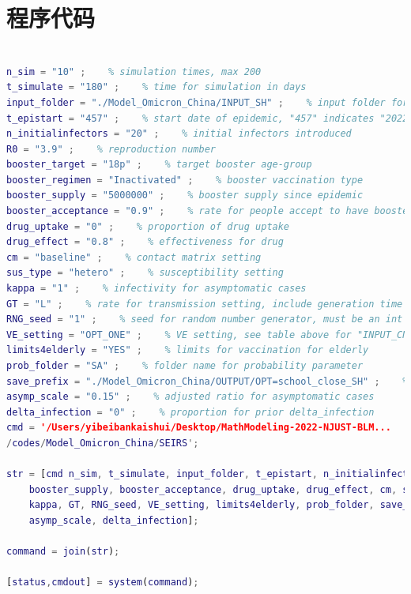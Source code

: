 \documentclass[bwprint]{gmcmthesis}
\numberwithin{figure}{section}
\begin{document}



\newpage
\appendix
\section{程序代码}
\begin{lstlisting}[language=Matlab] 
% 主函数

n_sim = "10" ;    % simulation times, max 200
t_simulate = "180" ;    % time for simulation in days
input_folder = "./Model_Omicron_China/INPUT_SH" ;    % input folder for parameters
t_epistart = "457" ;    % start date of epidemic, "457" indicates "2022-03-01"
n_initialinfectors = "20" ;    % initial infectors introduced
R0 = "3.9" ;    % reproduction number
booster_target = "18p" ;    % target booster age-group
booster_regimen = "Inactivated" ;    % booster vaccination type
booster_supply = "5000000" ;    % booster supply since epidemic
booster_acceptance = "0.9" ;    % rate for people accept to have booster shot
drug_uptake = "0" ;    % proportion of drug uptake
drug_effect = "0.8" ;    % effectiveness for drug
cm = "baseline" ;    % contact matrix setting
sus_type = "hetero" ;    % susceptibility setting
kappa = "1" ;    % infectivity for asymptomatic cases
GT = "L" ;    % rate for transmission setting, include generation time
RNG_seed = "1" ;    % seed for random number generator, must be an int
VE_setting = "OPT_ONE" ;    % VE setting, see table above for "INPUT_CN"
limits4elderly = "YES" ;    % limits for vaccination for elderly
prob_folder = "SA" ;    % folder name for probability parameter
save_prefix = "./Model_Omicron_China/OUTPUT/OPT=school_close_SH" ;    % save path prefix
asymp_scale = "0.15" ;    % adjusted ratio for asymptomatic cases
delta_infection = "0" ;    % proportion for prior delta_infection
cmd = '/Users/yibeibankaishui/Desktop/MathModeling-2022-NJUST-BLM...
/codes/Model_Omicron_China/SEIRS';

str = [cmd n_sim, t_simulate, input_folder, t_epistart, n_initialinfectors, R0, booster_target, booster_regimen,... 
    booster_supply, booster_acceptance, drug_uptake, drug_effect, cm, sus_type, ...
    kappa, GT, RNG_seed, VE_setting, limits4elderly, prob_folder, save_prefix, ...
    asymp_scale, delta_infection];

command = join(str);

[status,cmdout] = system(command);

 \end{lstlisting}
 
\end{document}
